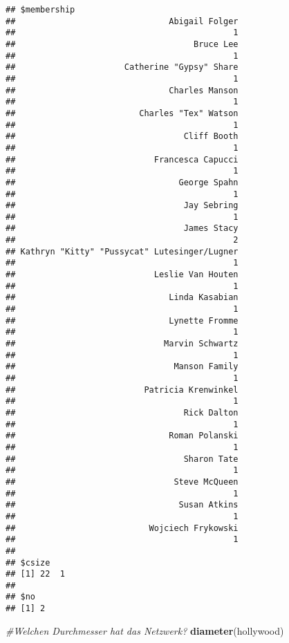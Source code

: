 \documentclass[
]{article}
\newenvironment{Shaded}{\begin{snugshade}}{\end{snugshade}}
\newcommand{\CommentTok}[1]{\textcolor[rgb]{0.56,0.35,0.01}{\textit{#1}}}
\newcommand{\KeywordTok}[1]{\textcolor[rgb]{0.13,0.29,0.53}{\textbf{#1}}}
\newcommand{\NormalTok}[1]{#1}
\begin{document}
\begin{verbatim}
## $membership
##                               Abigail Folger 
##                                            1 
##                                    Bruce Lee 
##                                            1 
##                      Catherine "Gypsy" Share 
##                                            1 
##                               Charles Manson 
##                                            1 
##                         Charles "Tex" Watson 
##                                            1 
##                                  Cliff Booth 
##                                            1 
##                            Francesca Capucci 
##                                            1 
##                                 George Spahn 
##                                            1 
##                                  Jay Sebring 
##                                            1 
##                                  James Stacy 
##                                            2 
## Kathryn "Kitty" "Pussycat" Lutesinger/Lugner 
##                                            1 
##                            Leslie Van Houten 
##                                            1 
##                               Linda Kasabian 
##                                            1 
##                               Lynette Fromme 
##                                            1 
##                              Marvin Schwartz 
##                                            1 
##                                Manson Family 
##                                            1 
##                          Patricia Krenwinkel 
##                                            1 
##                                  Rick Dalton 
##                                            1 
##                               Roman Polanski 
##                                            1 
##                                  Sharon Tate 
##                                            1 
##                                Steve McQueen 
##                                            1 
##                                 Susan Atkins 
##                                            1 
##                           Wojciech Frykowski 
##                                            1 
## 
## $csize
## [1] 22  1
## 
## $no
## [1] 2
\end{verbatim}

\begin{Shaded}
\begin{Highlighting}[]
\CommentTok{#Welchen    Durchmesser hat das Netzwerk?}
\KeywordTok{diameter}\NormalTok{(hollywood)}
\end{Highlighting}
\end{Shaded}
\end{document}
